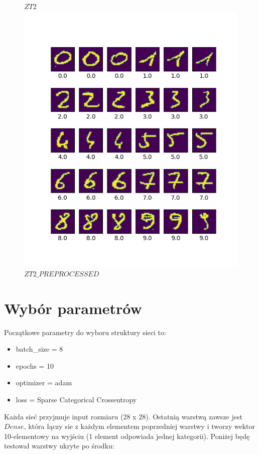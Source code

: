 \begin{figure}[!htb]
    $ZT2$
\endminipage\hfill
{}
    \centering
    \includegraphics[width=\linewidth]{dataset_my_preprocessed.png}
    $ZT2\_PREPROCESSED$
\endminipage
\end{figure}

\section*{Wybór parametrów}
Początkowe parametry do wyboru struktury sieci to:
\begin{itemize}
    \item batch\_size = 8
    \item epochs = 10
    \item optimizer = adam
    \item loss = Sparse Categorical Crossentropy
\end{itemize}
Każda sieć przyjmuje input rozmiaru (28 x 28). Ostatnią warstwą zawsze jest $Dense$, która łączy sie z każdym elementem poprzedniej warstwy i tworzy wektor 10-elementowy na wyjściu (1 element odpowiada jednej kategorii). Poniżej będę testował warstwy ukryte po środku:\\

